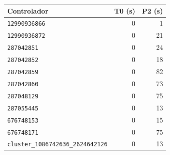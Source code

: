 \begin{tabular}{lrr}\hline
Controlador & T0 (s) & P2 (s) \\\hline
\texttt{12990936866} & 0 & 1 \\
\texttt{12990936872} & 0 & 21 \\
\texttt{287042851} & 0 & 24 \\
\texttt{287042852} & 0 & 18 \\
\texttt{287042859} & 0 & 82 \\
\texttt{287042860} & 0 & 73 \\
\texttt{287048129} & 0 & 75 \\
\texttt{287055445} & 0 & 13 \\
\texttt{676748153} & 0 & 15 \\
\texttt{676748171} & 0 & 75 \\
\texttt{cluster\_}\allowbreak\texttt{1086742636\_}\allowbreak\texttt{2624642126} & 0 & 13 \\
\hline\end{tabular}
